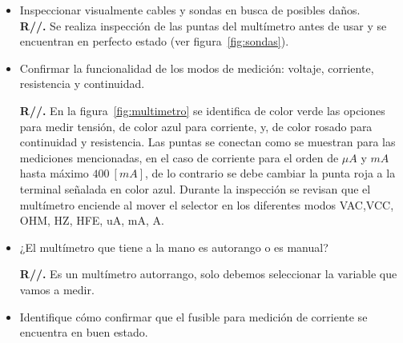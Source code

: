 \begin{itemize}
    \item Inspeccionar visualmente cables y sondas en busca de posibles daños.\\
    
    \textbf{R//.} Se realiza inspección de las puntas del multímetro antes de usar y se encuentran en perfecto estado (ver figura~\ref{fig:sondas}).
      
    \item Confirmar la funcionalidad de los modos de medición: voltaje, corriente, resistencia y continuidad.
    
    \textbf{R//.} En la figura~\ref{fig:multimetro} se identifica de color verde las opciones para medir tensión, de color azul para corriente, y, de color rosado para continuidad y resistencia. Las puntas se conectan como se muestran para las mediciones mencionadas, en el caso de corriente para el orden de $\mu A$ y $mA$ hasta máximo $400~[mA]$, de lo contrario se debe cambiar la punta roja a la terminal señalada en color azul. Durante la inspección se revisan que el multímetro enciende al mover el selector en los diferentes modos VAC,VCC, OHM, HZ, HFE, uA, mA, A.
       
    \item ¿El multímetro que tiene a la mano es autorango o es manual? 
    
    \textbf{R//.} Es un multímetro autorrango, solo debemos seleccionar la variable que vamos a medir.
    
    \item Identifique cómo confirmar que el fusible para medición de corriente se encuentra en buen estado.
    

\end{itemize}
